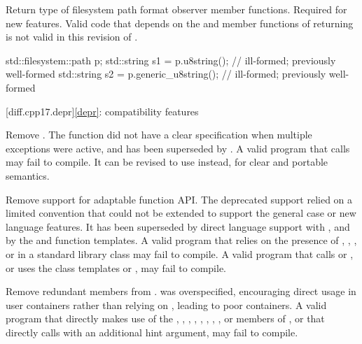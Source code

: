 \change
Return type of filesystem path format observer member functions.
\rationale
Required for new features.
\effect
Valid \CppXVII{} code that depends on the  and
 member functions of 
returning  is not valid in this revision of \Cpp{}.
\begin{example}
\begin{codeblock}
std::filesystem::path p;
std::string s1 = p.u8string();          // ill-formed; previously well-formed
std::string s2 = p.generic_u8string();  // ill-formed; previously well-formed
\end{codeblock}
\end{example}

[diff.cpp17.depr]{\ref*{depr}: compatibility features}

\nodiffref
\change
Remove .
\rationale
The function did not have a clear specification when multiple exceptions were
active, and has been superseded by .
\effect
A valid \CppXVII{} program that calls  may fail
to compile. It can be revised to use  instead,
for clear and portable semantics.

\nodiffref
\change
Remove support for adaptable function API.
\rationale
The deprecated support relied on a limited convention that could not be
extended to support the general case or new language features. It has been
superseded by direct language support with , and by the
 and  function templates.
\effect
A valid \CppXVII{} program that relies on the presence of ,
, , or
 in a standard library class may fail to compile. A
valid \CppXVII{} program that calls  or , or uses the
class templates  or , may fail to
compile.

\nodiffref
\change
Remove redundant members from .
\rationale
{} was overspecified, encouraging direct usage in user containers
rather than relying on , leading to poor containers.
\effect
A valid \CppXVII{} program that directly makes use of the ,
, , ,
, , , , or
 members of , or that directly calls
 with an additional hint argument, may fail to compile.

